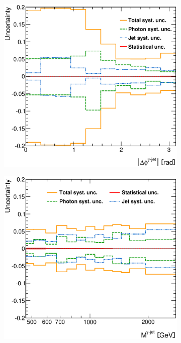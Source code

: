 \documentclass[12pt, twoside]{article}
\numberwithin{equation}{section}
\numberwithin{figure}{section}
\newenvironment{changemargin}[2]{%
\begin{list}{}{%
\setlength{\topsep}{0pt}%
\setlength{\leftmargin}{#1}%
\setlength{\rightmargin}{#2}%
\setlength{\listparindent}{\parindent}%
\setlength{\itemindent}{\parindent}%
\setlength{\parsep}{\parskip}%
}%
\item[]}{\end{list}}
\begin{document}
\begin{figure}
\begin{changemargin}{-1.0cm}{-0.75cm}
\begin{changemargin}{-0.75cm}{-1.0cm}
        \vspace{0.2cm}
        \begin{subfigure}[b]{0.37\textwidth}
            \includegraphics[width=\textwidth]{./images/TotalSystematicUncertainty/TOT_SYST-107.eps}
            \subcaption{}
            \label{fig:SystUncerDeltaPhiPhotonJet}
        \end{subfigure}
        \begin{subfigure}[b]{0.37\textwidth}
            \includegraphics[width=\textwidth]{./images/TotalSystematicUncertainty/TOT_SYST-108.eps}

\end{subfigure}
\end{changemargin}
\end{changemargin}
\end{figure}
\end{document}
